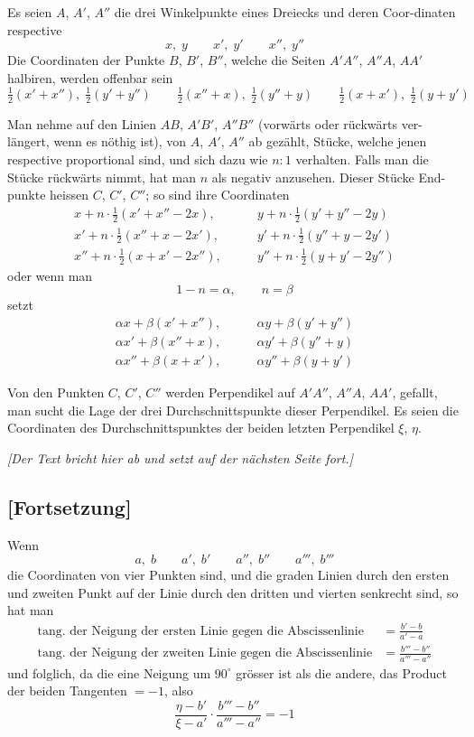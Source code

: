 \documentclass[12pt,a4paper]{article}
\begin{document}
Es seien $A$, $A'$, $A''$ die drei Winkelpunkte eines Dreiecks und deren Coor-\/dinaten respective
\[
x,\; y\qquad x',\; y'\qquad x'',\; y''
\]
Die Coordinaten der Punkte $B$, $B'$, $B''$, welche die Seiten $A'A''$, $A''A$, $AA'$
halbiren, werden offenbar sein
\[
\tfrac{1}{2}(x'+x''),\; \tfrac{1}{2}(y'+y'')\qquad
\tfrac{1}{2}(x''+x),\; \tfrac{1}{2}(y''+y)\qquad
\tfrac{1}{2}(x+x'),\; \tfrac{1}{2}(y+y')
\]

Man nehme auf den Linien $AB$, $A'B'$, $A''B''$ (vorw\"arts oder r\"uckw\"arts ver-\/l\"angert, wenn es n\"othig ist), von $A$, $A'$, $A''$ ab gez\"ahlt, St\"ucke, welche jenen
respective proportional sind, und sich dazu wie $n:1$ verhalten. Falls man die
St\"ucke r\"uckw\"arts nimmt, hat man $n$ als negativ anzusehen. Dieser St\"ucke End-\/punkte heissen $C$, $C'$, $C''$; so sind ihre Coordinaten
\begin{align*}
x + n\cdot\tfrac{1}{2}(x'+x''-2x),&\qquad y + n\cdot\tfrac{1}{2}(y'+y''-2y) \\
x' + n\cdot\tfrac{1}{2}(x''+x-2x'),&\qquad y' + n\cdot\tfrac{1}{2}(y''+y-2y') \\
x'' + n\cdot\tfrac{1}{2}(x+x'-2x''),&\qquad y'' + n\cdot\tfrac{1}{2}(y+y'-2y'')
\end{align*}
oder wenn man
\[
1-n = \alpha,\qquad n = \beta
\]
setzt
\begin{align*}
\alpha x + \beta(x'+x''),&\qquad \alpha y + \beta(y'+y'') \\
\alpha x' + \beta(x''+x),&\qquad \alpha y' + \beta(y''+y) \\
\alpha x'' + \beta(x+x'),&\qquad \alpha y'' + \beta(y+y')
\end{align*}

Von den Punkten $C$, $C'$, $C''$ werden Perpendikel auf $A'A''$, $A''A$, $AA'$,
gefallt, man sucht die Lage der drei Durchschnittspunkte dieser Perpendikel.
Es seien die Coordinaten des Durchschnittspunktes der beiden letzten Perpendikel
$\xi$, $\eta$.

\textit{[Der Text bricht hier ab und setzt auf der n\"achsten Seite fort.]}

\newpage
\subsection*{[Fortsetzung]}

Wenn
\[
a,\; b\qquad a',\; b'\qquad a'',\; b''\qquad a''',\; b'''
\]
die Coordinaten von vier Punkten sind, und die graden Linien durch den ersten
und zweiten Punkt auf der Linie durch den dritten und vierten senkrecht sind,
so hat man
\begin{align*}
\text{tang. der Neigung der ersten Linie gegen die Abscissenlinie} &= \frac{b'-b}{a'-a} \\
\text{tang. der Neigung der zweiten Linie gegen die Abscissenlinie} &= \frac{b'''-b''}{a'''-a''}
\end{align*}
und folglich, da die eine Neigung um $90^\circ$ gr\"osser ist als die andere, das Product
 der beiden Tangenten $= -1$, also
\[
\frac{\eta - b'}{\xi - a'} \cdot \frac{b'''-b''}{a'''-a''} = -1
\]
\end{document}
